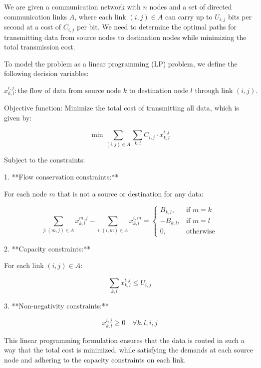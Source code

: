 \documentclass{article}
\begin{document}
We are given a communication network with \( n \) nodes and a set of directed communication links \( A \), where each link \( (i,j) \in A \) can carry up to \( U_{i,j} \) bits per second at a cost of \( C_{i,j} \) per bit. We need to determine the optimal paths for transmitting data from source nodes to destination nodes while minimizing the total transmission cost.

To model the problem as a linear programming (LP) problem, we define the following decision variables:

\[
x_{k,l}^{i,j} : \text{the flow of data from source node } k \text{ to destination node } l \text{ through link } (i,j).
\]

Objective function:
Minimize the total cost of transmitting all data, which is given by:

\[
\min \sum_{(i,j) \in A} \sum_{k,l} C_{i,j} \cdot x_{k,l}^{i,j}
\]

Subject to the constraints:

1. **Flow conservation constraints:**

   For each node \( m \) that is not a source or destination for any data:

   \[
   \sum_{j: (m,j) \in A} x_{k,l}^{m,j} - \sum_{i: (i,m) \in A} x_{k,l}^{i,m} = 
   \begin{cases} 
   B_{k,l}, & \text{if } m = k \\
   -B_{k,l}, & \text{if } m = l \\
   0, & \text{otherwise}
   \end{cases}
   \]

2. **Capacity constraints:**

   For each link \( (i,j) \in A \):

   \[
   \sum_{k,l} x_{k,l}^{i,j} \leq U_{i,j}
   \]

3. **Non-negativity constraints:**

   \[
   x_{k,l}^{i,j} \geq 0 \quad \forall k,l,i,j
   \]

This linear programming formulation ensures that the data is routed in such a way that the total cost is minimized, while satisfying the demands at each source node and adhering to the capacity constraints on each link.
\end{document}
